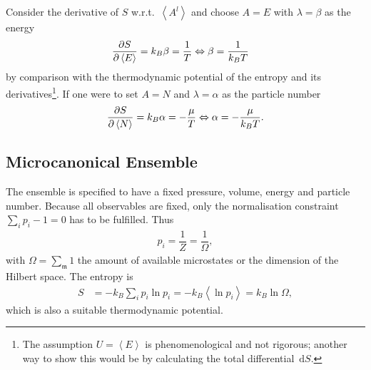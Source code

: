 \documentclass[a4paper,10pt]{article}
\newcommand{\td}{\,\text{d}}
\numberwithin{equation}{section}
\begin{document}
\begin{multicols}{2}
Consider the derivative of $S$ w.r.t.\ $\left\langle A^l\right\rangle $ and choose $A=E$ with $\lambda =\beta $ as the energy
\begin{align} 
  \diffp[]{S}{\left\langle E\right\rangle } &= k_B\beta =\dfrac{1}{T}\Leftrightarrow \beta =\dfrac{1}{k_BT}
\end{align} 
by comparison with the thermodynamic potential of the entropy and its derivatives\footnote{The assumption $U=\left\langle E\right\rangle $ is phenomenological and not rigorous; another way to show this would be by calculating the total differential $\td S$.}.
If one were to set $A=N$ and $\lambda =\alpha $ as the particle number
\begin{align} 
  \diffp[]{S}{\left\langle N\right\rangle }=k_B\alpha =-\dfrac{\mu }{T}\Leftrightarrow \alpha =-\dfrac{\mu }{k_BT}
.\end{align} 


\subsection{Microcanonical Ensemble}
The ensemble is specified to have a fixed pressure, volume, energy and particle number.
Because all observables are fixed, only the normalisation constraint $\sum_{i}^{}p_i-1=0$ has to be fulfilled.
Thus
\begin{align} 
  p_i=\dfrac{1}{Z}=\dfrac{1}{\Omega }
,\end{align} 
with $\Omega =\sum_{\mathfrak{m}}^{}1$ the amount of available microstates or the dimension of the Hilbert space.
The entropy is
\begin{align} 
  S &= -k_B\sum_{i}^{}p_i\ln p_i=-k_B\left\langle \ln p_i\right\rangle =k_B\ln \Omega 
,\end{align} 
which is also a suitable thermodynamic potential.


\end{multicols}
\end{document}
